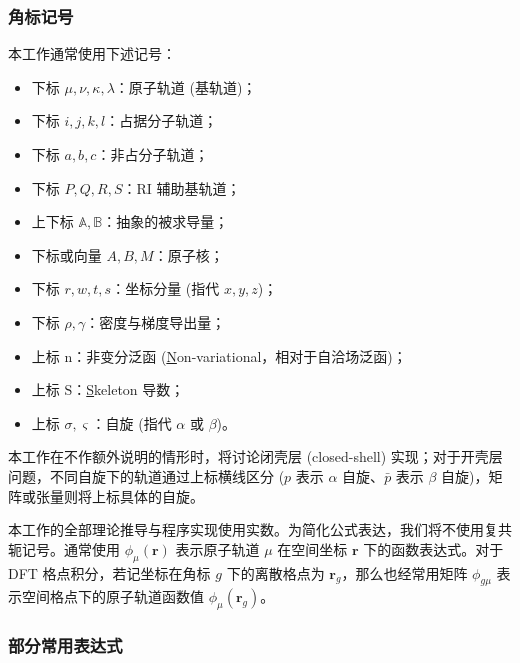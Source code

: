 \subsubsection{角标记号}

本工作通常使用下述记号：
\begin{itemize}[nosep]
  \item 下标 $\mu, \nu, \kappa, \lambda$：原子轨道 (基轨道)；
  \item 下标 $i, j, k, l$：占据分子轨道；
  \item 下标 $a, b, c$：非占分子轨道；
  \item 下标 $P, Q, R, S$：RI 辅助基轨道；
  \item 上下标 $\mathbb{A}, \mathbb{B}$：抽象的被求导量；
  \item 下标或向量 $A, B, M$：原子核；
  \item 下标 $r, w, t, s$：坐标分量 (指代 $x, y, z$)；
  \item 下标 $\rho, \gamma$：密度与梯度导出量；
  \item 上标 $\mathrm{n}$：非变分泛函 (\underline{N}on-variational，相对于自洽场泛函)；
  \item 上标 $\mathrm{S}$：\underline{S}keleton 导数；
  \item 上标 $\sigma, \varsigma$：自旋 (指代 $\alpha$ 或 $\beta$)。
\end{itemize}

本工作在不作额外说明的情形时，将讨论闭壳层 (closed-shell) 实现；对于开壳层问题，不同自旋下的轨道通过上标横线区分 ($p$ 表示 $\alpha$ 自旋、$\bar p$ 表示 $\beta$ 自旋)，矩阵或张量则将上标具体的自旋。

本工作的全部理论推导与程序实现使用实数。为简化公式表达，我们将不使用复共轭记号。通常使用 $\phi_\mu (\bm{r})$ 表示原子轨道 $\mu$ 在空间坐标 $\bm{r}$ 下的函数表达式。对于 DFT 格点积分，若记坐标在角标 $g$ 下的离散格点为 $\bm{r}_g$，那么也经常用矩阵 $\phi_{g \mu}$ 表示空间格点下的原子轨道函数值 $\phi_\mu (\bm{r}_g)$。

\subsubsection{部分常用表达式}

